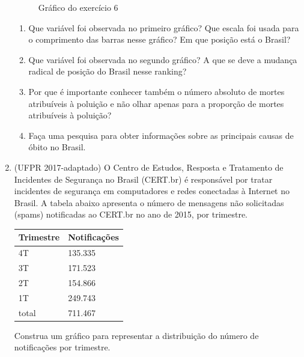 \begin{enumerate}
\begin{figure}[H]
\noindent{}
\caption{Gráfico do exercício 6}\label{\detokenize{PE103-E:fig-ar-carregado}}\label{\detokenize{PE103-E:id17}}\end{figure}
\begin{enumerate}
\item {} 
Que variável foi observada no primeiro gráfico? Que escala foi usada para o comprimento das barras nesse gráfico? Em que posição está o Brasil?

\item {} 
Que variável foi observada no segundo gráfico? A que se deve a mudança radical de posição do Brasil nesse ranking?

\item {} 
Por que é importante conhecer também o número absoluto de mortes atribuíveis à poluição e não olhar apenas para a proporção de mortes atribuíveis à poluição?

\item {} 
Faça uma pesquisa para obter informações sobre as principais causas de óbito no Brasil.

\end{enumerate}

\item (UFPR 2017-adaptado)  O Centro de Estudos, Resposta e Tratamento de Incidentes de Segurança no Brasil (CERT.br) é responsável por tratar incidentes de segurança em computadores e redes conectadas à Internet no Brasil. A tabela abaixo apresenta o número de mensagens não solicitadas (spams) notificadas ao CERT.br no ano de 2015, por trimestre.


\begin{savenotes}\sphinxattablestart
\centering
\begin{tabulary}{\linewidth}[t]{|T|T|}
\hline

Trimestre
&
Notificações
\\
\hline
4T
&
135.335
\\
\hline
3T
&
171.523
\\
\hline
2T
&
154.866
\\
\hline
1T
&
249.743
\\
\hline
total
&
711.467
\\
\hline
\end{tabulary}
\par
\sphinxattableend\end{savenotes}

Construa um gráfico para representar a distribuição do número de notificações por trimestre.


\end{enumerate}
